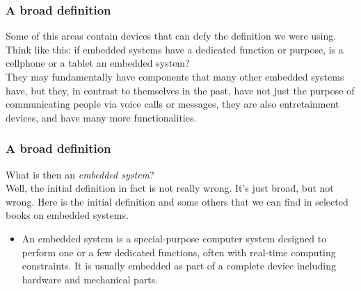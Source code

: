 \documentclass[aspectratio=169]{beamer}
\begin{document}

\begin{frame}
  \frametitle{A broad definition}
  Some of this areas contain devices that can defy the definition we were using.\\[5mm] \pause
  Think like this: if embedded systems have a dedicated function or purpose, is a cellphone or a tablet an embedded system?\\[5mm] \pause
  They may fundamentally have components that many other embedded systems have, but they, in contrast to themselves in the past, have not just the purpose of communicating people via voice calls or messages, they are also entretainment devices, and have many more functionalities.
\end{frame}

\begin{frame}
  \frametitle{A broad definition}
  What is then an \textit{embedded system}?\\[5mm] \pause
  Well, the initial definition in fact is not really wrong. It's just broad, but not wrong. Here is the initial definition and some others that we can find in selected books on embedded systems.
  \begin{itemize}
    \item An embedded system is a special-purpose computer system designed to perform one or a few dedicated functions, often with real-time computing constraints. It is usually embedded as part of a complete device including hardware and mechanical parts.
  \end{itemize}
\end{frame}
\end{document}
